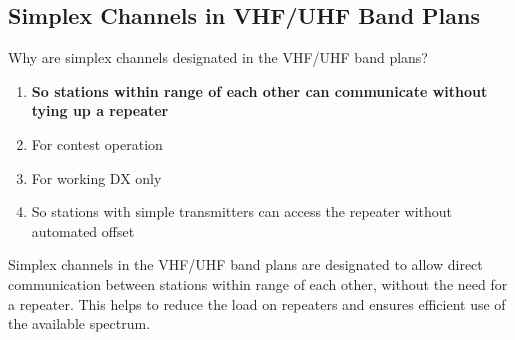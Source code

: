\subsection{Simplex Channels in VHF/UHF Band Plans}
\label{T2B09}

\begin{tcolorbox}[colback=gray!10!white,colframe=black!75!black,title=T2B09]
Why are simplex channels designated in the VHF/UHF band plans?
\begin{enumerate}[noitemsep]
    \item \textbf{So stations within range of each other can communicate without tying up a repeater}
    \item For contest operation
    \item For working DX only
    \item So stations with simple transmitters can access the repeater without automated offset
\end{enumerate}
\end{tcolorbox}

Simplex channels in the VHF/UHF band plans are designated to allow direct communication between stations within range of each other, without the need for a repeater. This helps to reduce the load on repeaters and ensures efficient use of the available spectrum.